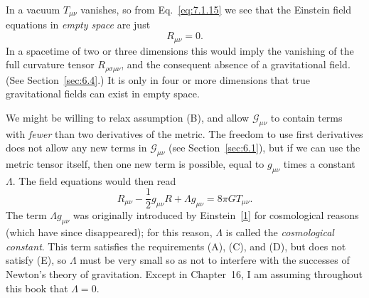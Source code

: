 In a vacuum \(T_{\mu\nu}\) vanishes, so from Eq.~\eqref{eq:7.1.15} we see
that the Einstein field equations in \emph{empty space} are just
\begin{equation}
  R_{\mu\nu}=0.
  \tag{7.1.16}\label{eq:7.1.16}
\end{equation}
In a spacetime of two or three dimensions this would imply the vanishing of
the full curvature tensor \(R_{\rho\sigma\mu\nu}\), and the consequent
absence of a gravitational field. (See Section~\ref{sec:6.4}.) It is only in
four or more dimensions that true gravitational fields can exist in empty
space.

We might be willing to relax assumption (B), and allow
\(\mathcal G_{\mu\nu}\) to contain terms with \emph{fewer} than two
derivatives of the metric. The freedom to use first derivatives does not
allow any new terms in \(\mathcal G_{\mu\nu}\) (see
Section~\ref{sec:6.1}), but if we can use the metric tensor itself, then one
new term is possible, equal to \(g_{\mu\nu}\) times a constant \(\Lambda\).
The field equations would then read
\[
  R_{\mu\nu}
  -\frac12g_{\mu\nu}R
  +\Lambda g_{\mu\nu}
  =
  8\pi G T_{\mu\nu}.
\]
The term \(\Lambda g_{\mu\nu}\) was originally introduced by
Einstein~\hyperref[ch7-ref-1]{[1]} for cosmological reasons (which have since
disappeared); for this reason, \(\Lambda\) is called the
\emph{cosmological constant}. This term satisfies the requirements (A), (C),
and (D), but does not satisfy (E), so \(\Lambda\) must be very small so as
not to interfere with the successes of Newton's theory of gravitation.
Except in Chapter~16, I am assuming throughout this book that
\(\Lambda=0\).
